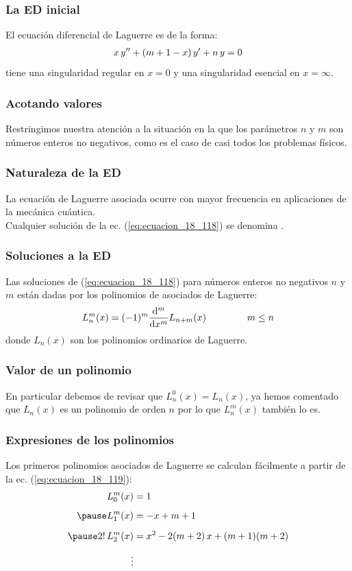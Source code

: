\documentclass[12pt]{beamer}
\begin{document}
\begin{frame}
\frametitle{La ED inicial}
El ecuación diferencial de Laguerre es de la forma:
\pause
\begin{align}
x \, {y}^{\prime \prime} + (m +  1 - x) \, {y}^{\prime} + n \, y = 0
\label{eq:ecuacion_18_118}
\end{align}
tiene una singularidad regular en $x = 0$ y una singularidad esencial en $x = \infty$.
\end{frame}
\begin{frame}
\frametitle{Acotando valores}
Restringimos nuestra atención a la situación en la que los parámetros $n$ y $m$ son números enteros no negativos, como es el caso de casi todos los problemas físicos.
\end{frame}
\begin{frame}
\frametitle{Naturaleza de la ED}
La ecuación de Laguerre asociada ocurre con mayor frecuencia en aplicaciones de la mecánica cuántica.
\\
\bigskip
\pause
Cualquier solución de la ec. (\ref{eq:ecuacion_18_118}) se denomina .
\end{frame}
\begin{frame}
\frametitle{Soluciones a la ED}
Las soluciones de (\ref{eq:ecuacion_18_118}) para números enteros no negativos $n$ y $m$ están dadas por los polinomios de asociados de Laguerre:
\pause
\begin{align}
L_{n}^{m} (x) = (-1)^{m} \dv[m]{x} L_{n+m} (x) \hspace{1.5cm} m \leq n
\label{eq:ecuacion_18_119}
\end{align}
donde $L_{n} (x)$ son los polinomios ordinarios de Laguerre.
\end{frame}
\begin{frame}
\frametitle{Valor de un polinomio}
En particular debemos de revisar que $L_{n}^{0} (x) = L_{n}(x)$, \pause ya hemos comentado que $L_{n} (x)$ es un polinomio de orden $n$ por lo que $L_{n}^{m} (x)$ también lo es.
\end{frame}
\begin{frame}
\frametitle{Expresiones de los polinomios}
Los primeros polinomios asociados de Laguerre se calculan fácilmente a partir de la ec. (\ref{eq:ecuacion_18_119}):
\pause
\begin{eqnarray*}
\begin{aligned}
L_{0}^{m} (x) &= 1 \\[0.5em] \pause
L_{1}^{m} (x) &= -x + m + 1 \\[0.5em] \pause
2! \, L_{2}^{m} (x) &= x^{2} - 2 (m + 2) \, x + (m + 1)(m + 2) \\[0.5em]
\vdots
\end{aligned}
\end{eqnarray*}
\end{frame}
\end{document}
